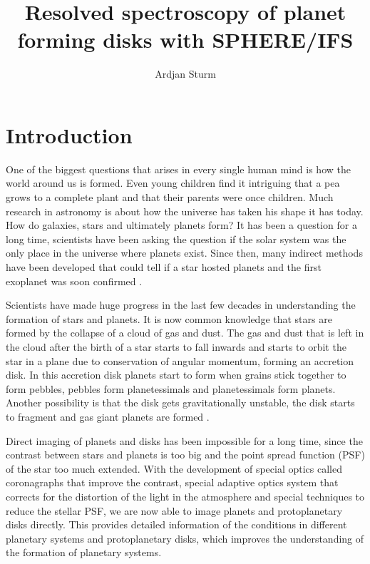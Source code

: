 \documentclass[twoside,single,12pt]{lion-msc}
\title{Resolved spectroscopy of planet forming disks with SPHERE/IFS}
\author{Ardjan Sturm}
\affiliation{Huygens-Kamerlingh Onnes Laboratory, Leiden University}   %
\begin{document}

\maketitle

\tableofcontents
\cleardoublepage



\chapter{Introduction}
One of the biggest questions that arises in every single human mind is how the world around us is formed. Even young children find it intriguing that a pea grows to a complete plant and that their parents were once children. Much research in astronomy is about how the universe has taken his shape it has today. How do galaxies, stars and ultimately planets form? It has been a question for a long time, scientists have been asking the question if the solar system was the only place in the universe where planets exist. Since then, many indirect methods have been developed that could tell if a star hosted planets and the first exoplanet was soon confirmed \cite{Mayor1995}.
\bigskip

Scientists have made huge progress in the last few decades in understanding the formation of stars and planets. It is now common knowledge that stars are formed by the collapse of a cloud of gas and dust. The gas and dust that is left in the cloud after the birth of a star starts to fall inwards and starts to orbit the star in a plane due to conservation of angular momentum, forming an accretion disk. In this accretion disk planets start to form when grains stick together to form pebbles, pebbles form planetessimals and planetessimals form planets. Another possibility is that the disk gets gravitationally unstable, the disk starts to fragment and gas giant planets are formed \cite{Armitage2010}.
\bigskip

Direct imaging of planets and disks has been impossible for a long time, since the contrast between stars and planets is too big and the point spread function (PSF) of the star too much extended. With the development of special optics called coronagraphs that improve the contrast, special adaptive optics system that corrects for the distortion of the light in the atmosphere and special techniques to reduce the stellar PSF, we are now able to image planets and protoplanetary disks directly. This provides detailed information of the conditions in different planetary systems and protoplanetary disks, which improves the understanding of the formation of planetary systems.
\bigskip
\end{document}
